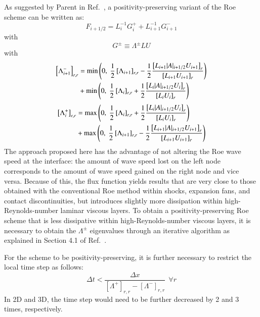 \documentclass{warpdoc}
\newcommand{\alb}{\vspace{0.2cm}\\} %
\begin{document}
As suggested by Parent in Ref.\ \cite{jcp:2013:parent:2}, a positivity-preserving variant of the Roe scheme can be written as:
%
\begin{equation}
F_{i+1/2}=L^{-1}_{i} G_{i}^+  + L^{-1}_{i+1} G_{i+1}^- 
\label{eqn:FDS_1o_positive}
\end{equation}
%
with 
%
\begin{equation}
G^\pm\equiv \Lambda^\pm LU
\label{eqn:Gplusminus}
\end{equation}
%
with
%
\begin{align}
 \left[\Lambda_{i+1}^-\right]_{r,r}  &= {\min\left(0,~\frac{1}{2} \left[\Lambda_{i+1}\right]_{r,r}  - \frac{1}{2}\frac{\left[L_{i+1} |A|_{i+1/2} U_{i+1}\right]_r}{\left[L_{i+1} U_{i+1}\right]_r}\right)}\nonumber\alb
&+
{\min\left(0,~\frac{1}{2}\left[\Lambda_i\right]_{r,r}    + \frac{1}{2}\frac{\left[L_i |A|_{i+1/2} U_i\right]_r}{\left[L_i U_i\right]_r}\right)}
\label{eqn:lambdaminus_Roepos}
\end{align}
%
%
\begin{align}
 \left[ \Lambda_{i}^+\right]_{r,r}  &= {\max\left(0,~\frac{1}{2}\left[\Lambda_i\right]_{r,r}    + \frac{1}{2}\frac{\left[L_i |A|_{i+1/2} U_i\right]_r}{\left[L_i U_i\right]_r}\right)}\nonumber\alb
&+
{\max\left(0,~\frac{1}{2} \left[\Lambda_{i+1}\right]_{r,r}  - \frac{1}{2}\frac{\left[L_{i+1} |A|_{i+1/2} U_{i+1}\right]_r}{\left[L_{i+1} U_{i+1}\right]_r}\right)}
\label{eqn:lambdaplus_Roepos}
\end{align}
%
The approach proposed here has the advantage of not altering the Roe wave speed at the interface: the amount of wave speed lost on the left node corresponds to the amount of wave speed gained on the right node and vice versa.  Because of this, the flux function yields results that are very close to those obtained with the conventional Roe method within shocks, expansion fans, and contact discontinuities, but introduces slightly more dissipation within high-Reynolds-number laminar viscous layers. To obtain a positivity-preserving Roe scheme that is less dissipative within high-Reynolds-number viscous layers, it is necessary to obtain the $\Lambda^\pm$ eigenvalues through an iterative algorithm as explained in Section 4.1 of Ref.\ \cite{jcp:2013:parent:2}. 

For the scheme to be positivity-preserving, it is further necessary to restrict the local time step as follows:
%
\begin{equation}
\Delta t
<
\frac{\Delta x}{   
 \left[\Lambda^+ \right]_{r,r}-\left[\Lambda^- \right]_{r,r}
}~~\forall r
\end{equation}
%
In 2D and 3D, the time step would need to be further decreased by 2 and 3 times, respectively.
\end{document}
